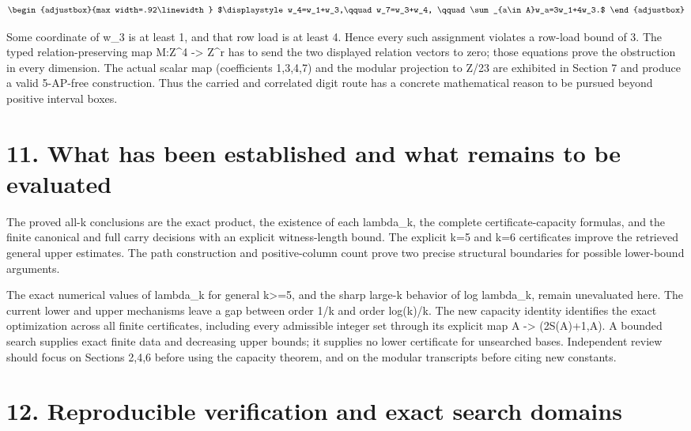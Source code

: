 \[
\begin{adjustbox}{max width=.92\linewidth}
$\displaystyle w_4=w_1+w_3,\qquad w_7=w_3+w_4,
\qquad \sum_{a\in A}w_a=3w_1+4w_3.$
\end{adjustbox}
\]

Some coordinate of w\_3 is at least 1, and that row load is at least 4. Hence every such assignment violates a row-load bound of 3. The typed relation-preserving map M:Z\^{}4 -\textgreater{} Z\^{}r has to send the two displayed relation vectors to zero; those equations prove the obstruction in every dimension. The actual scalar map (coefficients 1,3,4,7) and the modular projection to Z/23 are exhibited in Section 7 and produce a valid 5-AP-free construction. Thus the carried and correlated digit route has a concrete mathematical reason to be pursued beyond positive interval boxes.

\section{11. What has been established and what remains to be evaluated}\label{n03-what-has-been-established-and-what-remains-to-be-evaluated}

The proved all-k conclusions are the exact product, the existence of each lambda\_k, the complete certificate-capacity formulas, and the finite canonical and full carry decisions with an explicit witness-length bound. The explicit k=5 and k=6 certificates improve the retrieved general upper estimates. The path construction and positive-column count prove two precise structural boundaries for possible lower-bound arguments.

The exact numerical values of lambda\_k for general k\textgreater=5, and the sharp large-k behavior of log lambda\_k, remain unevaluated here. The current lower and upper mechanisms leave a gap between order 1/k and order log(k)/k. The new capacity identity identifies the exact optimization across all finite certificates, including every admissible integer set through its explicit map A -\textgreater{} (2S(A)+1,A). A bounded search supplies exact finite data and decreasing upper bounds; it supplies no lower certificate for unsearched bases. Independent review should focus on Sections 2,4,6 before using the capacity theorem, and on the modular transcripts before citing new constants.

\section{12. Reproducible verification and exact search domains}\label{n03-reproducible-verification-and-exact-search-domains}

